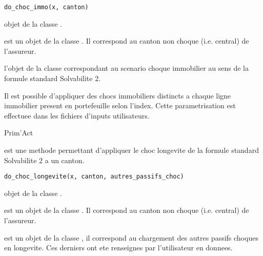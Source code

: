 \documentclass[a4paper]{book}
\begin{document}
%
\begin{Usage}
\begin{verbatim}
do_choc_immo(x, canton)
\end{verbatim}
\end{Usage}
%
\begin{Arguments}
\begin{ldescription}
\item[\code{x}] objet de la classe .

\item[\code{canton}] est un objet de la classe . Il correspond au canton non choque (i.e. central) 
de l'assureur.
\end{ldescription}
\end{Arguments}
%
\begin{Value}
 l'objet  de la classe  correspondant au scenario choque immobilier au sens de la formule standard Solvabilite 2.
\end{Value}
%
\begin{Note}\relax
Il est possible d'appliquer des chocs immobiliers distincts a chaque ligne immobilier present en portefeuille
selon l'index.
Cette parametrisation est effectuee dans les fichiers d'inputs utilisateurs.
\end{Note}
%
\begin{Author}\relax
Prim'Act
\end{Author}
%
\begin{Description}\relax
{} est une methode permettant d'appliquer le choc longevite de la formule standard
Solvabilite 2 a un canton.
\end{Description}
%
\begin{Usage}
\begin{verbatim}
do_choc_longevite(x, canton, autres_passifs_choc)
\end{verbatim}
\end{Usage}
%
\begin{Arguments}
\begin{ldescription}
\item[\code{x}] objet de la classe .

\item[\code{canton}] est un objet de la classe . Il correspond au canton non choque (i.e. central) de l'assureur.

\item[\code{autres\_passifs\_choc}] est un objet de la classe , il correspond au chargement des autres passifs choques en longevite.
Ces derniers ont ete renseignes par l'utilisateur en donnees.
\end{ldescription}
\end{Arguments}
\end{document}
